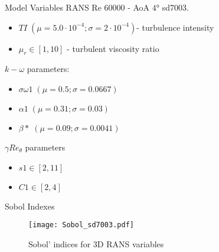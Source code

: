 \begin{frame}{Model Variables}
RANS Re $\num{60000}$ - AoA $\ang{4}$ sd7003.

\begin{itemize}
    \item    $TI \; (\mu =5.0\cdot 10^{-4} ; \sigma=2\cdot 10^{-4})$- turbulence intensity
    \item $\mu_r \in [1,10]$ - turbulent viscosity ratio
\end{itemize}

$k-\omega$ parameters:
\begin{itemize}
    \item $\sigma \omega 1\; (\mu =0.5 ; \sigma=0.0667 )$
    \item $\alpha 1\; (\mu = 0.31 ;\sigma= 0.03)$ 
    \item $\beta *\; (\mu = 0.09; \sigma=0.0041 )$  
\end{itemize}
$\gamma Re_\theta$ parameters
\begin{itemize}
\item $s1\in [2,11]$
\item $C1\in [2,4]$
\end{itemize}
\end{frame}


\begin{frame}{Sobol Indexes}
    
    \begin{figure}
        \centering
        \texttt{[image: Sobol\_sd7003.pdf]}
        \caption{Sobol' indices for 3D RANS variables}
\end{figure} 
\end{frame}